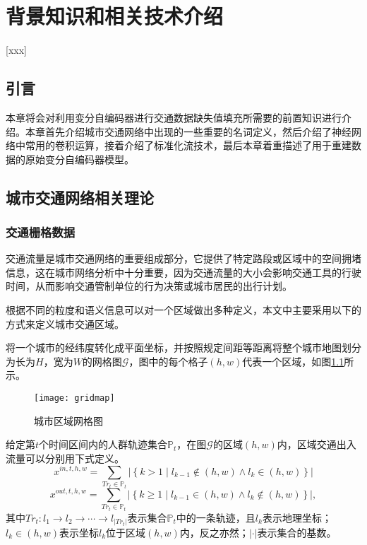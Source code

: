
\chapter[相关理论和技术介绍]{背景知识和相关技术介绍}[xxx]
\section{引言}
本章将会对利用变分自编码器进行交通数据缺失值填充所需要的前置知识进行介绍。本章首先介绍城市交通网络中出现的一些重要的名词定义，然后介绍了神经网络中常用的卷积运算，接着介绍了标准化流技术，最后本章着重描述了用于重建数据的原始变分自编码器模型。
\section{城市交通网络相关理论}
\subsection{交通栅格数据}
交通流量是城市交通网络的重要组成部分，它提供了特定路段或区域中的空间拥堵信息，这在城市网络分析中十分重要，因为交通流量的大小会影响交通工具的行驶时间，从而影响交通管制单位的行为决策或城市居民的出行计划。

根据不同的粒度和语义信息可以对一个区域做出多种定义，本文中主要采用以下的方式来定义城市交通区域。
\begin{definition} 将一个城市的经纬度转化成平面坐标，并按照规定间距等距离将整个城市地图划分为长为$H$，宽为$W$的网格图$\mathcal{G}$，图中的每个格子$(h, w)$代表一个区域，如图\ref{gridmap}所示。

\end{definition}
\begin{figure}[h]
\centering
\texttt{[image: gridmap]}
\vspace{0.5em}
\caption{城市区域网格图 \label{gridmap}}
\end{figure}

\begin{definition} \label{def_flow}
给定第$t$个时间区间内的人群轨迹集合$\mathbb{P}_{t}$，在图$\mathcal{G}$的区域$(h, w)$内，区域交通出入流量可以分别用下式定义。
\begin{equation}
	x^{in, t, h, w} = \sum_{Tr_{t} \in \mathbb{P}_{t}}\left|\left\{k>1 \mid l_{k-1} \notin(h, w) \wedge l_{k} \in(h, w)\right\}\right|
\end{equation}
\begin{equation}
	x^{out, t, h, w} = \sum_{Tr_{t} \in \mathbb{P}_{t}}\left|\left\{k \geq 1 \mid l_{k-1} \in(h, w) \wedge l_{k} \notin(h, w)\right\}\right|,
\end{equation}
其中$Tr_{t}: l_{1} \rightarrow l_{2} \rightarrow \cdots \rightarrow l_{|Tr_t|}$表示集合$\mathbb{P}_t$中的一条轨迹，且$l_k$表示地理坐标；$l_k \in(h, w)$表示坐标$l_k$位于区域$(h, w)$内，反之亦然；$| \cdot |$表示集合的基数。
\end{definition}


